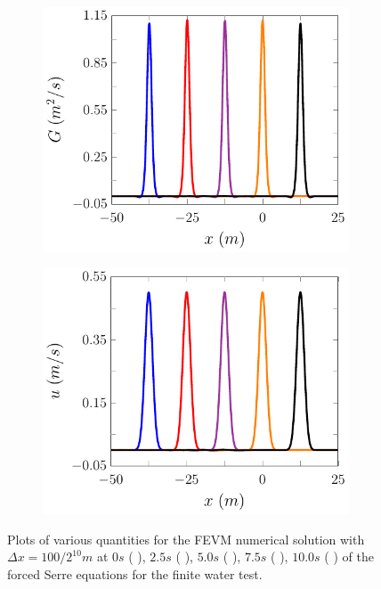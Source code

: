 \begin{figure}
\begin{subfigure}{0.5\textwidth}
		\vspace{0.5cm}
	\end{subfigure}
	\begin{subfigure}{0.5\textwidth}
		\includegraphics[width=\textwidth]{./chp5/figures/Forced/Wet/FEVMExG.pdf}
		\vspace{0.5cm}
	\end{subfigure}%
	\begin{subfigure}{0.5\textwidth}
		\includegraphics[width=\textwidth]{./chp5/figures/Forced/Wet/FEVMExu.pdf}
		\vspace{0.5cm}
	\end{subfigure}
	\caption{Plots of various quantities for the FEVM numerical solution with $\Delta x = 100/ 2^{10} m$ at $0s$ ({\color{blue} \solidrule}), $2.5s$ ({\color{red} \solidrule}), $5.0s$ ({\color{violet!80!white} \solidrule}), $7.5s$ ({\color{orange} \solidrule}), $10.0s$ ({\color{black} \solidrule}) of the forced Serre equations for the finite water test.}
	\label{fig:ForcedWetFEVMP2PExAll}
\end{figure}

